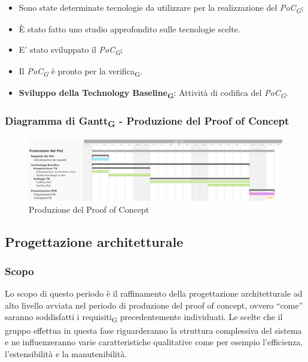 \:
\begin{itemize}
	\item Sono state determinate tecnologie da utilizzare per la realizzazione del \textit{PoC\textsubscript{G}};
	\item È stato fatto uno studio approfondito sulle tecnologie scelte.
\end{itemize}

\:
\begin{itemize}
	\item E' stato sviluppato il \textit{PoC\textsubscript{G}};
	\item Il \textit{PoC\textsubscript{G}} è pronto per la verifica\textsubscript{G}.
\end{itemize}

\:
\begin{itemize}
    \item \textbf{Sviluppo della Technology Baseline\textsubscript{G}}: Attività di codifica del \textit{PoC\textsubscript{G}}.
\end{itemize}

\subsubsection{Diagramma di Gantt\textsubscript{G} - Produzione del Proof of Concept}

\begin{figure}[H]
\centering
\includegraphics[width=\textwidth]{img/4_produzione.png}
\caption{Produzione del Proof of Concept}
\end{figure}

\subsection{Progettazione architetturale}
\subsubsection{Scopo}
Lo scopo di questo periodo è il raffinamento della progettazione architetturale ad alto livello avviata nel periodo di produzione del proof of concept, ovvero “come” saranno soddisfatti i requisiti\textsubscript{G} precedentemente individuati.
Le scelte che il gruppo effettua in questa fase riguarderanno la struttura complessiva del sistema e ne influenzeranno varie caratteristiche qualitative come per esempio l’efficienza, l’estensibilità e la manutenibilità.

